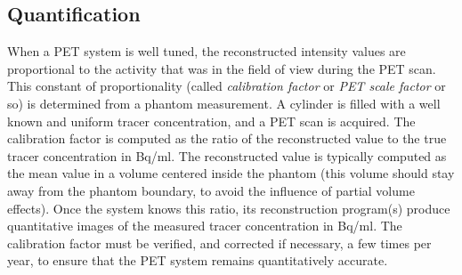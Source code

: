 \subsection{Quantification \label{sec:scalefactor}}
When a PET system is well tuned, the reconstructed intensity values
are proportional to the activity that was in the field of view during
the PET scan. This constant of proportionality (called {\em
calibration factor} or {\em PET scale factor} or so) is determined
from a phantom measurement. A cylinder is filled with a well known and
uniform tracer concentration, and a PET scan is acquired. The
calibration factor is computed as the ratio of the reconstructed value
to the true tracer concentration in Bq/ml.  The reconstructed value is
typically computed as the mean value in a volume centered inside the
phantom (this volume should stay away from the phantom boundary, to
avoid the influence of partial volume effects). Once the system knows
this ratio, its reconstruction program(s) produce quantitative images
of the measured tracer concentration in Bq/ml. The calibration factor
must be verified, and corrected if necessary, a few times per year, to
ensure that the PET system remains quantitatively accurate.
